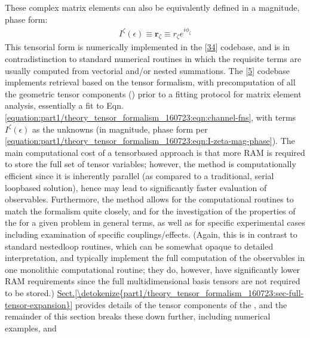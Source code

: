 \documentclass[letterpaper,table,10pt,english]{jupyterBook}
\begin{document}
\sphinxAtStartPar
These complex matrix elements can also be equivalently defined in a magnitude, phase
form:
\begin{equation}\label{equation:part1/theory_tensor_formalism_160723:eqn:I-zeta-mag-phase}
\begin{split}I^{\zeta}(\epsilon)\equiv\mathbf{r}_{\zeta}\equiv r_{\zeta}e^{i\phi_{\zeta}}\end{split}
\end{equation}
\sphinxAtStartPar
This tensorial form is numerically implemented in the  {[}\hyperlink{cite.backmatter/bibliography:id607}{34}{]} codebase, and is in contradistinction to standard numerical routines in which the requisite terms are usually computed from vectorial and/or nested summations. The  {[}\hyperlink{cite.backmatter/bibliography:id681}{5}{]} codebase implements {\hyperref[\detokenize{backmatter/glossary:term-radial-matrix-elements}]{}} retrieval based on the tensor formalism, with pre\sphinxhyphen{}computation of all the geometric tensor components ({\hyperref[\detokenize{backmatter/glossary:term-channel-functions}]{}}) prior to a fitting protocol for matrix element analysis, essentially a fit to Eqn. \eqref{equation:part1/theory_tensor_formalism_160723:eqn:channel-fns}, with terms \(I^{\zeta}(\epsilon)\) as the unknowns (in magnitude, phase form per \eqref{equation:part1/theory_tensor_formalism_160723:eqn:I-zeta-mag-phase}). The main computational cost of a tensor\sphinxhyphen{}based approach is that more RAM is required to store the full set of tensor variables; however, the method is computationally efficient since it is inherently parallel (as compared to a traditional, serial loop\sphinxhyphen{}based solution), hence may lead to significantly faster evaluation of observables. Furthermore, the method allows for the computational routines to match the formalism quite closely, and for the investigation of the properties of the {\hyperref[\detokenize{backmatter/glossary:term-channel-functions}]{}} for a given problem in general terms, as well as for specific experimental cases including examination of specific couplings/effects. (Again, this is in contrast to standard nested\sphinxhyphen{}loop routines, which can be somewhat opaque to detailed interpretation, and typically implement the full computation of the observables in one monolithic computational routine; they do, however, have significantly lower RAM requirements since the full multi\sphinxhyphen{}dimensional basis tensors are not required to be stored.) \hyperref[\detokenize{part1/theory_tensor_formalism_160723:sec-full-tensor-expansion}]{Sect.\@ \ref{\detokenize{part1/theory_tensor_formalism_160723:sec-full-tensor-expansion}}} provides details of the tensor components of the {\hyperref[\detokenize{backmatter/glossary:term-channel-functions}]{}}, and the remainder of this section breaks these down further, including numerical examples, and 
\end{document}
